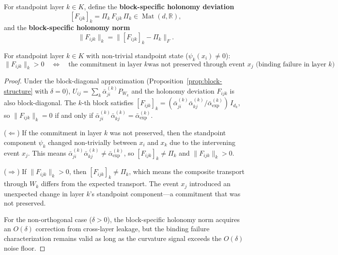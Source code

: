 \begin{definition}
\label{def:binding-failure}
For standpoint layer $k \in K$, define the \textbf{block-specific holonomy deviation}
\[
    [F_{ijk}]_k = \Pi_k\, F_{ijk}\, \Pi_k \in \operatorname{Mat}(d, \mathbb{R}),
\]
and the \textbf{block-specific holonomy norm}
\[
    \|F_{ijk}\|_k = \big\|[F_{ijk}]_k - \Pi_k\big\|_F.
\]
\end{definition}

\begin{theorem}
\label{thm:binding-failure}
For standpoint layer $k \in K$ with non-trivial standpoint state ($\psi_k(x_i) \neq 0$):
\[
    \|F_{ijk}\|_k > 0 \quad\Longleftrightarrow\quad \text{the commitment in layer $k$
    was not preserved through event $x_j$ (binding failure in layer $k$)}.
\]
\end{theorem}

\begin{proof}
Under the block-diagonal approximation (Proposition~\ref{prop:block-structure} with
$\delta = 0$), $U_{ij} = \sum_k \bar{\alpha}_{ji}^{(k)} P_{W_k}$ and the holonomy deviation
$F_{ijk}$ is also block-diagonal. The $k$-th block satisfies
$[F_{ijk}]_k = (\bar{\alpha}_{ji}^{(k)} \bar{\alpha}_{kj}^{(k)} /
\bar{\alpha}^{(k)}_{\exp})\, I_{d_k}$, so $\|F_{ijk}\|_k = 0$ if and only if
$\bar{\alpha}_{ji}^{(k)} \bar{\alpha}_{kj}^{(k)} = \bar{\alpha}^{(k)}_{\exp}$.

($\Leftarrow$) If the commitment in layer $k$ was not preserved, then the standpoint
component $\psi_k$ changed non-trivially between $x_i$ and $x_k$ due to the intervening
event $x_j$. This means $\bar{\alpha}_{ji}^{(k)} \bar{\alpha}_{kj}^{(k)} \neq
\bar{\alpha}^{(k)}_{\exp}$, so $[F_{ijk}]_k \neq \Pi_k$ and $\|F_{ijk}\|_k > 0$.

($\Rightarrow$) If $\|F_{ijk}\|_k > 0$, then $[F_{ijk}]_k \neq \Pi_k$, which means the
composite transport through $W_k$ differs from the expected transport. The event $x_j$
introduced an unexpected change in layer $k$'s standpoint component---a commitment that
was not preserved.

For the non-orthogonal case ($\delta > 0$), the block-specific holonomy norm acquires an
$O(\delta)$ correction from cross-layer leakage, but the binding failure characterization
remains valid as long as the curvature signal exceeds the $O(\delta)$ noise floor.
\end{proof}

